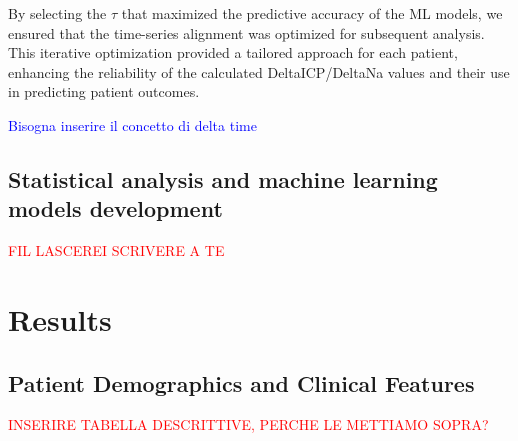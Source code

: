 
By selecting the $\tau$ that maximized the predictive accuracy of the ML models, we ensured that the time-series alignment was optimized for subsequent analysis. This iterative optimization provided a tailored approach for each patient, enhancing the reliability of the calculated DeltaICP/DeltaNa values and their use in predicting patient outcomes.


\textcolor{blue}{Bisogna inserire il concetto di delta time}

\subsection{Statistical analysis and machine learning models development}
\textcolor{red}{FIL LASCEREI SCRIVERE A TE}

\section {Results}
\subsection{Patient Demographics and Clinical Features}
\textcolor{red}{INSERIRE TABELLA DESCRITTIVE, PERCHE LE METTIAMO SOPRA?}

